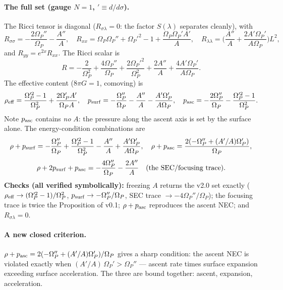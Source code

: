 \documentclass[11pt,a4paper]{article}
\theoremstyle{plain}
\theoremstyle{definition}
\theoremstyle{remark}
\begin{document}
\paragraph{The full set (gauge $N=1$, $'\equiv d/d\sigma$).} The Ricci tensor is diagonal
($R_{\sigma\lambda}=0$: the factor $S(\lambda)$ separates cleanly), with
\[
R_{\sigma\sigma}=-\frac{2\Omega_P''}{\Omega_P}-\frac{A''}{A},\quad
R_{xx}=\Omega_P\Omega_P''+\Omega_P'^2-1+\frac{\Omega_P\Omega_P'A'}{A},\quad
R_{\lambda\lambda}=\Big(\frac{A''}{A}+\frac{2A'\Omega_P'}{A\Omega_P}\Big)L^2,
\]
and $R_{yy}=e^{2x}R_{xx}$. The Ricci scalar is
\[
R=-\frac{2}{\Omega_P^2}+\frac{4\Omega_P''}{\Omega_P}+\frac{2\Omega_P'^2}{\Omega_P^2}
+\frac{2A''}{A}+\frac{4A'\Omega_P'}{A\Omega_P}.
\]
The effective content ($8\pi G=1$, comoving) is
\[
\rho_{\rm eff}=\frac{\Omega_P'^2-1}{\Omega_P^2}+\frac{2\Omega_P'A'}{\Omega_P A},\quad
p_{\rm surf}=-\frac{\Omega_P''}{\Omega_P}-\frac{A''}{A}-\frac{A'\Omega_P'}{A\Omega_P},\quad
p_{\rm asc}=-\frac{2\Omega_P''}{\Omega_P}-\frac{\Omega_P'^2-1}{\Omega_P^2}.
\]
Note $p_{\rm asc}$ contains \emph{no} $A$: the pressure along the ascent axis is set by the surface
alone. The energy-condition combinations are
\[
\rho+p_{\rm surf}=-\frac{\Omega_P''}{\Omega_P}+\frac{\Omega_P'^2-1}{\Omega_P^2}-\frac{A''}{A}
+\frac{A'\Omega_P'}{A\Omega_P},\quad
\rho+p_{\rm asc}=\frac{2(-\Omega_P''+(A'/A)\Omega_P')}{\Omega_P},
\]
\[
\rho+2p_{\rm surf}+p_{\rm asc}=-\frac{4\Omega_P''}{\Omega_P}-\frac{2A''}{A}\quad(\text{the SEC/focusing trace}).
\]
\textbf{Checks (all verified symbolically):} freezing $A$ returns the v2.0 set exactly
($\rho_{\rm eff}\to(\Omega_P'^2-1)/\Omega_P^2$, $p_{\rm surf}\to-\Omega_P''/\Omega_P$, SEC trace
$\to-4\Omega_P''/\Omega_P$); the focusing trace is twice the Proposition of v0.1; $\rho+p_{\rm asc}$
reproduces the ascent NEC; and $R_{\sigma\lambda}=0$.

\paragraph{A new closed criterion.} $\rho+p_{\rm asc}=2(-\Omega_P''+(A'/A)\Omega_P')/\Omega_P$ gives a
sharp condition: the ascent NEC is violated exactly when $(A'/A)\,\Omega_P'>\Omega_P''$ --- ascent rate
times surface expansion exceeding surface acceleration. The three are bound together: ascent, expansion,
acceleration.
\end{document}

